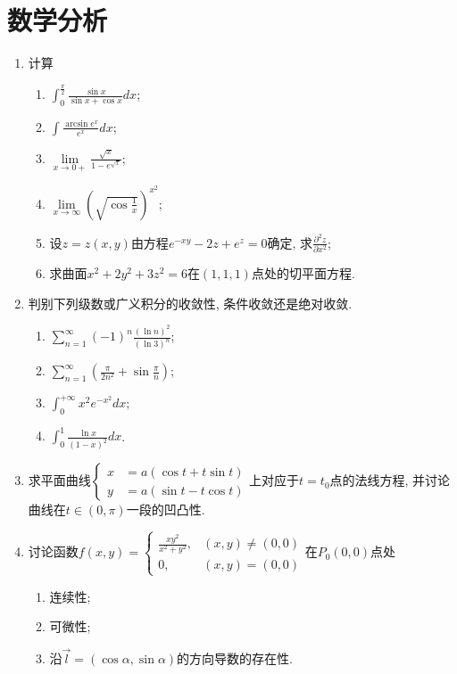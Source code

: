 \documentclass[12pt,a4paper,openany]{book}
\begin{document}
\section{数学分析}
\begin{enumerate}
\item 计算
\begin{enumerate}
\item $\displaystyle\int_{0}^{\frac{\pi}{2}}{\frac{\sin{x}}{\sin{x} + \cos{x}}dx}$;

\item $\displaystyle\int{\frac{\arcsin{e^x}}{e^x}dx}$;

\item $\lim\limits_{x \rightarrow 0+}{\frac{\sqrt{x}}{1 - e^{\sqrt{x}}}}$;

\item $\lim\limits_{x \rightarrow \infty}{\displaystyle(\sqrt{\cos\frac{1}{x}})^{x^2}}$;

\item 设$z = z(x, y)$由方程$e^{-xy} - 2z + e^z = 0$确定, 求$\displaystyle\frac{\partial^2z}{\partial{x^2}}$;

\item 求曲面$x^2 + 2y^2 + 3z^2 = 6$在$(1, 1, 1)$点处的切平面方程.
\end{enumerate}

\item 判别下列级数或广义积分的收敛性, 条件收敛还是绝对收敛.
\begin{enumerate}
\item $\sum\limits_{n=1}^{\infty}{\displaystyle(-1)^n\frac{(\ln{n})^2}{(\ln{3})^n}}$;
\item $\sum\limits_{n=1}^{\infty}{\displaystyle(\frac{\pi}{2n^2} + \sin\frac{\pi}{n})}$;
\item $\displaystyle\int_{0}^{+\infty}{x^2e^{-x^2}dx}$;
\item $\displaystyle\int_{0}^{1}{\frac{\ln{x}}{(1 - x)^2}dx}$.
\end{enumerate}

\item 求平面曲线$\left\{ \begin{aligned} x &= a(\cos{t} + t\sin{t}) \\ y &= a(\sin{t} - t\cos{t}) \end{aligned} \right.$上对应于$t = t_0$点的法线方程, 并讨论曲线在$t \in (0, \pi)$一段的凹凸性.

\item 讨论函数$f(x, y) = \left\{ \begin{array}{ll} \displaystyle\frac{xy^2}{x^2 + y^2}, & (x, y) \neq (0, 0) \\ 0, & (x, y) = (0, 0) \end{array} \right.$在$P_0(0, 0)$点处
\begin{enumerate}
\item 连续性;
\item 可微性;
\item 沿$\vec{l} = (\cos\alpha, \sin\alpha)$的方向导数的存在性.
\end{enumerate}


\end{enumerate}
\end{document}
